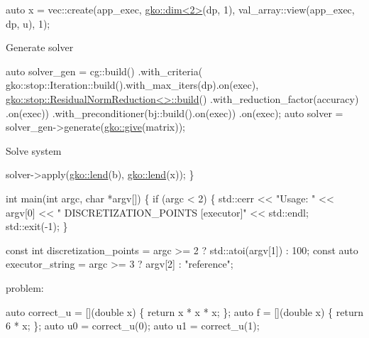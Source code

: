 \begin{DoxyCode}
\textcolor{keyword}{auto} x = vec::create(app\_exec, \hyperlink{structgko_1_1dim}{gko::dim<2>}(dp, 1),
                     val\_array::view(app\_exec, dp, u), 1);
\end{DoxyCode}


Generate solver


\begin{DoxyCode}
\textcolor{keyword}{auto} solver\_gen =
    cg::build()
        .with\_criteria(
            gko::stop::Iteration::build().with\_max\_iters(dp).on(exec),
            \hyperlink{classgko_1_1stop_1_1ResidualNormReduction}{gko::stop::ResidualNormReduction<>::build}()
                .with\_reduction\_factor(accuracy)
                .on(exec))
        .with\_preconditioner(bj::build().on(exec))
        .on(exec);
\textcolor{keyword}{auto} solver = solver\_gen->generate(\hyperlink{namespacegko_acbd3fd6d07e498892881e8e2ab0b4167}{gko::give}(matrix));
\end{DoxyCode}


Solve system


\begin{DoxyCode}
    solver->apply(\hyperlink{namespacegko_aa8cb4876b72e5e1036ea9575443c439b}{gko::lend}(b), \hyperlink{namespacegko_aa8cb4876b72e5e1036ea9575443c439b}{gko::lend}(x));
\}


\textcolor{keywordtype}{int} main(\textcolor{keywordtype}{int} argc, \textcolor{keywordtype}{char} *argv[])
\{
    \textcolor{keywordflow}{if} (argc < 2) \{
        std::cerr << \textcolor{stringliteral}{"Usage: "} << argv[0] << \textcolor{stringliteral}{" DISCRETIZATION\_POINTS [executor]"}
                  << std::endl;
        std::exit(-1);
    \}

    \textcolor{keyword}{const} \textcolor{keywordtype}{int} discretization\_points = argc >= 2 ? std::atoi(argv[1]) : 100;
    \textcolor{keyword}{const} \textcolor{keyword}{auto} executor\_string = argc >= 3 ? argv[2] : \textcolor{stringliteral}{"reference"};
\end{DoxyCode}


problem\+:


\begin{DoxyCode}
\textcolor{keyword}{auto} correct\_u = [](\textcolor{keywordtype}{double} x) \{ \textcolor{keywordflow}{return} x * x * x; \};
\textcolor{keyword}{auto} f = [](\textcolor{keywordtype}{double} x) \{ \textcolor{keywordflow}{return} 6 * x; \};
\textcolor{keyword}{auto} u0 = correct\_u(0);
\textcolor{keyword}{auto} u1 = correct\_u(1);
\end{DoxyCode}


